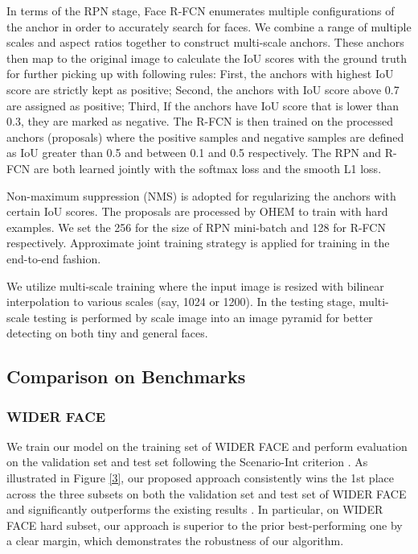 \documentclass{article} \usepackage{nips13submit_e,times}
\begin{document}
In terms of the RPN stage, Face R-FCN enumerates multiple configurations of the anchor in order to accurately search for faces. We combine a range of multiple scales and aspect ratios together to construct multi-scale anchors. These anchors then map to the original image to calculate the IoU scores with the ground truth for further picking up with following rules: First, the anchors with highest IoU score are strictly kept as positive; Second, the anchors with IoU score above 0.7 are assigned as positive; Third, If the anchors have IoU score that is lower than 0.3, they are marked as negative. The R-FCN is then trained on the processed anchors (proposals) where the positive samples and negative samples are defined as IoU greater than 0.5 and between 0.1 and 0.5 respectively. The RPN and R-FCN are both learned jointly with the softmax loss and the smooth L1 loss.

Non-maximum suppression (NMS) is adopted for regularizing the anchors with certain IoU scores. The proposals are processed by OHEM to train with hard examples. We set the 256 for the size of RPN mini-batch and 128 for R-FCN respectively. Approximate joint training strategy is applied for training in the end-to-end fashion.

We utilize multi-scale training where the input image is resized with bilinear interpolation to various scales (say, 1024 or 1200). In the testing stage, multi-scale testing is performed by scale image into an image pyramid for better detecting on both tiny and general faces.










\subsection{Comparison on Benchmarks}

\subsubsection{WIDER FACE}



We train our model on the training set of WIDER FACE and perform
evaluation on the validation set and test set following the Scenario-Int criterion \cite{wider}.
As illustrated in Figure \ref{3}, our proposed approach consistently wins the 1st place across the three subsets on both the validation set and test set of WIDER FACE and significantly outperforms the existing results \cite{ssh,sfd,HR,cmsrcnn,spl,vj2,faceness,wider}.
In particular, on WIDER FACE hard subset, our approach is superior to the prior best-performing one \cite{sfd} by a clear margin, which demonstrates the robustness of our algorithm.
\end{document}
